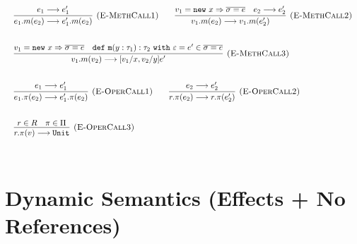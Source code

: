 \documentclass{llncs}
\newcommand{\keywadj}[1]{\mathtt{#1}}
\newcommand{\keyw}[1]{\keywadj{#1}~}
\begin{document}
\[
\begin{array}{lll}
\begin{array}{lllr}
	\infer[\textsc{(E-MethCall1)}]
		{e_1.m(e_2) \longrightarrow e_1'.m(e_2)}
		{e_1 \longrightarrow e_1'}
		
		~~~~~~
		
	\infer[\textsc{(E-MethCall2)}]
		{v_1.m(e_2) \longrightarrow v_1.m(e_2')}
		{v_1 = \keywadj{new}~x \Rightarrow \overline{\sigma = e} & e_2 \longrightarrow e_2'}\\[5ex]
		
	\infer[\textsc{(E-MethCall3)}]
		{v_1.m(v_2)
			\longrightarrow
		 [v_1/x, v_2/y]e'}
  		{v_1 = \keywadj{new}~x \Rightarrow \overline{\sigma = e} & \keywadj{def~m}(y: \tau_1) : \tau_2~\keyw{with} \varepsilon = e' \in \overline {\sigma = e}} \\[5ex]

			
	\infer[\textsc{(E-OperCall1)}]
		{e_1.\pi(e_2)
			\longrightarrow
		 e_1'.\pi(e_2)}
		{e_1 \longrightarrow e_1'}
~~~~~~
			\infer[\textsc{(E-OperCall2)}]
		{r.\pi(e_2)
			\longrightarrow
		 r.\pi(e_2')}
		{e_2 \longrightarrow e_2'} \\[5ex]
			
			\infer[\textsc{(E-OperCall3)}]
		{r.\pi(v)
			\longrightarrow
		 \keywadj{Unit}}
		{r \in R & \pi \in \Pi} \\[5ex]
			
		
\end{array}
\end{array}
\]


\section{Dynamic Semantics (Effects + No References)}

\end{document}
